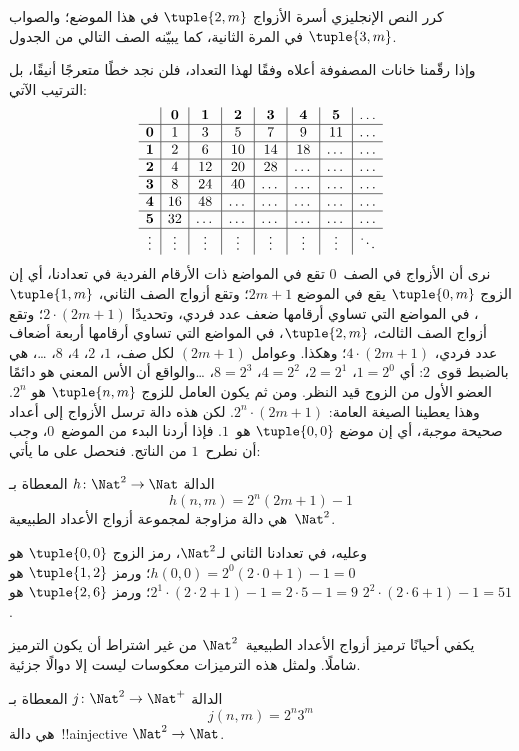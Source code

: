 \documentclass[../../../include/open-logic-section]{subfiles}
\begin{document}
\begin{explain}
\begin{editorial}
كرر النص الإنجليزي أسرة الأزواج $\tuple{2,m}$ في هذا الموضع؛ والصواب
$\tuple{3,m}$ في المرة الثانية، كما يبيّنه الصف التالي من الجدول.
\end{editorial}
وإذا رقّمنا خانات المصفوفة أعلاه وفقًا لهذا التعداد، فلن نجد خطًا
متعرجًا أنيقًا، بل الترتيب الآتي:
\[
\begin{array}{ c | c | c | c | c | c | c | c }
& \mathbf 0 & \mathbf 1 & \mathbf 2 & \mathbf 3 & \mathbf 4 & \mathbf 5 & \dots \\
\hline
\mathbf 0 & 1 & 3 & 5 & 7 & 9 & 11 & \dots \\
\hline
\mathbf 1 & 2 & 6 & 10 & 14 & 18 & \dots & \dots \\
\hline
\mathbf 2 & 4 & 12 & 20 & 28 & \dots & \dots & \dots \\
\hline
\mathbf 3 & 8 & 24 & 40 & \dots & \dots & \dots & \dots \\
\hline
\mathbf 4 & 16 & 48 & \dots & \dots & \dots & \dots & \dots \\
\hline
\mathbf 5 & 32 & \dots & \dots & \dots & \dots & \dots & \dots \\
\hline
\vdots & \vdots & \vdots & \vdots & \vdots & \vdots & \vdots & \ddots\\
\end{array}
\]
نرى أن الأزواج في الصف~$0$ تقع في المواضع ذات الأرقام الفردية في
تعدادنا، أي إن الزوج $\tuple{0,m}$ يقع في الموضع $2m+1$؛ وتقع أزواج
الصف الثاني، $\tuple{1,m}$، في المواضع التي تساوي أرقامها ضعف عدد
فردي، وتحديدًا $2 \cdot (2m+1)$؛ وتقع أزواج الصف الثالث،
$\tuple{2,m}$، في المواضع التي تساوي أرقامها أربعة أضعاف عدد فردي،
$4 \cdot (2m+1)$؛ وهكذا. وعوامل $(2m+1)$ لكل صف، $1$، $2$، $4$،
$8$، \dots، هي بالضبط قوى~$2$: أي $1= 2^0$، $2 = 2^1$،
$4 = 2^2$، $8 = 2^3$، \dots\@ والواقع أن الأس المعني هو دائمًا
العضو الأول من الزوج قيد النظر. ومن ثم يكون العامل للزوج
$\tuple{n,m}$ هو $2^n$. وهذا يعطينا الصيغة العامة:
$2^n \cdot (2m+1)$. لكن هذه دالة ترسل الأزواج إلى أعداد صحيحة
\emph{موجبة}، أي إن موضع $\tuple{0,0}$ هو~$1$. فإذا أردنا البدء من
الموضع~$0$، وجب أن نطرح~$1$ من الناتج. فنحصل على ما يأتي:
\end{explain}

\begin{ex}
الدالة $h\colon \Nat^2 \to \Nat$ المعطاة بـ
\[
h(n,m) = 2^n (2m+1) - 1
\]
هي دالة مزاوجة لمجموعة أزواج الأعداد الطبيعية~$\Nat^2$.
\end{ex}

\begin{explain}
وعليه، في تعدادنا الثاني لـ$\Nat^2$، رمز الزوج
$\tuple{0,0}$ هو $h(0,0) = 2^0(2\cdot 0+1) - 1 = 0$؛
ورمز $\tuple{1,2}$ هو $2^{1} \cdot (2 \cdot 2 + 1) - 1 = 2
\cdot 5 - 1 = 9$؛ ورمز $\tuple{2,6}$ هو $2^{2} \cdot (2
\cdot 6 + 1) - 1 = 51$.
\end{explain}

يكفي أحيانًا ترميز أزواج الأعداد الطبيعية~$\Nat^2$ من غير اشتراط
أن يكون الترميز شاملًا. ولمثل هذه الترميزات معكوسات ليست إلا دوالًا
جزئية.

\begin{ex}
الدالة $j\colon \Nat^2 \to \Nat^+$ المعطاة بـ
\[
j(n,m) = 2^n3^m
\]
هي دالة~!!a{injective} $\Nat^2 \to \Nat$.
\end{ex}
\end{document}
